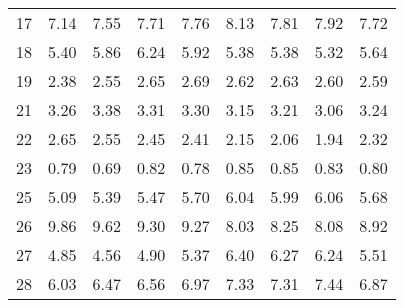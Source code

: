 \begin{table}[]
\begin{center}
\begin{tabular}{crrrrrrrr}
17    & 7.14                     & 7.55                     & 7.71                     & 7.76                     & 8.13                     & 7.81                     & 7.92                     & 7.72                        \\
18    & 5.40                     & 5.86                     & 6.24                     & 5.92                     & 5.38                     & 5.38                     & 5.32                     & 5.64                        \\
19    & 2.38                     & 2.55                     & 2.65                     & 2.69                     & 2.62                     & 2.63                     & 2.60                     & 2.59                        \\
21    & 3.26                     & 3.38                     & 3.31                     & 3.30                     & 3.15                     & 3.21                     & 3.06                     & 3.24                        \\
22    & 2.65                     & 2.55                     & 2.45                     & 2.41                     & 2.15                     & 2.06                     & 1.94                     & 2.32                        \\
23    & 0.79                     & 0.69                     & 0.82                     & 0.78                     & 0.85                     & 0.85                     & 0.83                     & 0.80                        \\
25    & 5.09                     & 5.39                     & 5.47                     & 5.70                     & 6.04                     & 5.99                     & 6.06                     & 5.68                        \\
26    & 9.86                     & 9.62                     & 9.30                     & 9.27                     & 8.03                     & 8.25                     & 8.08                     & 8.92                        \\
27    & 4.85                     & 4.56                     & 4.90                     & 5.37                     & 6.40                     & 6.27                     & 6.24                     & 5.51                        \\
28    & 6.03                     & 6.47                     & 6.56                     & 6.97                     & 7.33                     & 7.31                     & 7.44                     & 6.87                        \\

\end{tabular}
\end{center}
\end{table}
